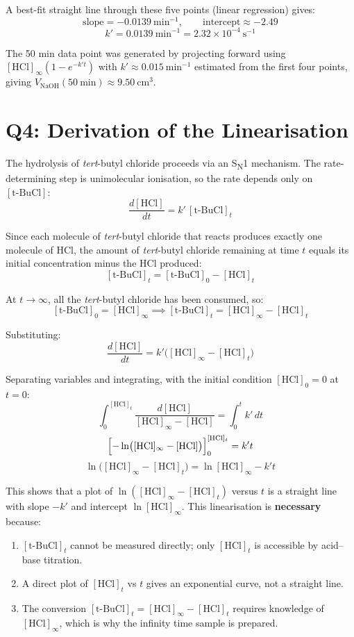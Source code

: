 \documentclass[12pt,a4paper]{article}
\begin{document}
A best-fit straight line through these five points (linear regression) gives:
\[
  \text{slope} = -0.0139\ \text{min}^{-1}, \qquad
  \text{intercept} \approx -2.49
\]
\[
  \boxed{k' = 0.0139\ \text{min}^{-1} = 2.32 \times 10^{-4}\ \text{s}^{-1}}
\]

\noindent*The 50 min data point was generated by projecting forward using
$[\text{HCl}]_\infty(1 - e^{-k't})$ with $k' \approx 0.015\ \text{min}^{-1}$
estimated from the first four points, giving $V_\text{NaOH}(50\ \text{min}) \approx 9.50\ \text{cm}^3$.

\section*{Q4: Derivation of the Linearisation}

The hydrolysis of \textit{tert}-butyl chloride proceeds via an S\textsubscript{N}1 mechanism.
The rate-determining step is unimolecular ionisation, so the rate depends only on
$[\text{t-BuCl}]$:
\[
  \frac{d[\text{HCl}]}{dt} = k'\,[\text{t-BuCl}]_t
\]

Since each molecule of \textit{tert}-butyl chloride that reacts produces exactly one molecule
of HCl, the amount of \textit{tert}-butyl chloride remaining at time $t$ equals its initial
concentration minus the HCl produced:
\[
  [\text{t-BuCl}]_t = [\text{t-BuCl}]_0 - [\text{HCl}]_t
\]

At $t \to \infty$, all the \textit{tert}-butyl chloride has been consumed, so:
\[
  [\text{t-BuCl}]_0 = [\text{HCl}]_\infty
  \implies
  [\text{t-BuCl}]_t = [\text{HCl}]_\infty - [\text{HCl}]_t
\]

Substituting:
\[
  \frac{d[\text{HCl}]}{dt} = k'\bigl([\text{HCl}]_\infty - [\text{HCl}]_t\bigr)
\]

Separating variables and integrating, with the initial condition $[\text{HCl}]_0 = 0$ at $t = 0$:
\[
  \int_0^{[\text{HCl}]_t}
    \frac{d[\text{HCl}]}{[\text{HCl}]_\infty - [\text{HCl}]}
  = \int_0^t k'\,dt
\]
\[
  \Bigl[-\ln\bigl([\text{HCl}]_\infty - [\text{HCl}]\bigr)\Bigr]_0^{[\text{HCl}]_t}
  = k' t
\]
\[
  \boxed{
    \ln\!\bigl([\text{HCl}]_\infty - [\text{HCl}]_t\bigr)
    = \ln[\text{HCl}]_\infty - k't
  }
\]

This shows that a plot of $\ln([\text{HCl}]_\infty - [\text{HCl}]_t)$ versus $t$ is a straight
line with slope $-k'$ and intercept $\ln[\text{HCl}]_\infty$.
This linearisation is \textbf{necessary} because:
\begin{enumerate}[noitemsep]
  \item $[\text{t-BuCl}]_t$ cannot be measured directly; only $[\text{HCl}]_t$ is accessible
        by acid--base titration.
  \item A direct plot of $[\text{HCl}]_t$ vs $t$ gives an exponential curve, not a straight line.
  \item The conversion $[\text{t-BuCl}]_t = [\text{HCl}]_\infty - [\text{HCl}]_t$ requires
        knowledge of $[\text{HCl}]_\infty$, which is why the infinity time sample is prepared.
\end{enumerate}
\end{document}
